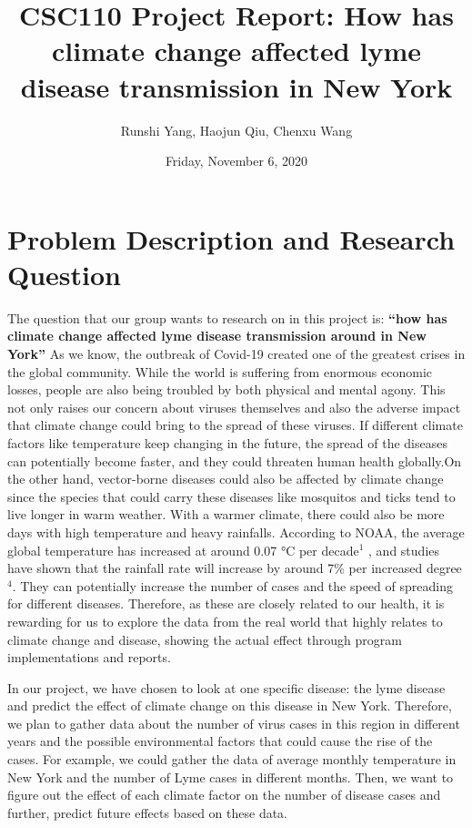 \documentclass[fontsize=11pt]{article}
\title{CSC110 Project Report: How has climate change affected lyme disease transmission in New York}
\author{Runshi Yang, Haojun Qiu, Chenxu Wang}
\date{Friday, November 6, 2020}
\begin{document}
\maketitle

\section*{Problem Description and Research Question}

The question that our group wants to research on in this project is: \textbf{“how has climate change affected lyme disease transmission around in New York”} As we know, the outbreak of Covid-19 created one of the greatest crises in the global community. While the world is suffering from enormous economic losses, people are also being troubled by both physical and mental agony. This not only raises our concern about viruses themselves and also the adverse impact that climate change could bring to the spread of these viruses. If different climate factors like temperature keep changing in the future, the spread of the diseases can potentially become faster, and they could threaten human health globally.On the other hand, vector-borne diseases could also be affected by climate change since the species that could carry these diseases like mosquitos and ticks tend to live longer in warm weather. With a warmer climate, there could also be more days with high temperature and heavy rainfalls. According to NOAA, the average global temperature has increased at around 0.07 °C per decade$^1$ , and studies have shown that the rainfall rate will increase by around 7\% per increased degree$^4$. They can potentially increase the number of cases and the speed of spreading for different diseases. Therefore, as these are closely related to our health, it is rewarding for us to explore the data from the real world that highly relates to climate change and disease, showing the actual effect through program implementations and reports. 


In our project, we have chosen to look at one specific disease: the lyme disease and predict the effect of climate change on this disease in New York. Therefore, we plan to gather data about the number of virus cases in this region in different years and the possible environmental factors that could cause the rise of the cases. For example, we could gather the data of average monthly temperature in New York and the number of Lyme cases in different months. Then, we want to figure out the effect of each climate factor on the number of disease cases and further, predict future effects based on these data. 
\end{document}
